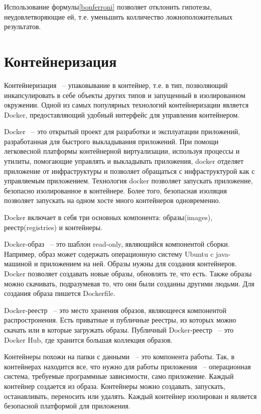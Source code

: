 \documentclass[times,specification,annotation]{itmo-student-thesis}
\begin{document}
Использование формулы\ref{bonferroni} позволяет отклонить гипотезы, неудовлетворяющие ей, т.е. уменьшить колличество ложноположительных результатов.\cite{Bonferroni}

\section{Контейнеризация}

Контейнеризация ~-- упаковывание в контейнер, т.е. в тип, позволяющий инкапсулировать в себе объекты других типов\cite{Containerization} и запущенный в изолированном окружении. Одной из самых популярных технологий контейнеризации является Docker\cite{Docker}, предоставляющий удобный интерфейс для управления контейнером. 

Docker ~-- это открытый проект для разработки и эксплуатации приложений, разработанная для быстрого выкладывания приложений. При помощи легковесной платформы контейнерной виртуализации, используя процессы и утилиты, помогающие управлять и выкладывать приложения\cite{DockerUnderstanding}, docker отделяет приложение от инфраструктуры и позволяет обращаться с инфраструктурой как с управляемым приложением. Технология docker позволяет запускать приложение, безопасно изолированное в контейнере. Более того, безопасная изоляция позволяет запускать на одном хосте много контейнеров одновременно. 

Docker включает в себя три основных компонента: образы(images), реестр(registries) и контейнеры.

Docker-образ ~-- это шаблон read-only, являющийся компонентой сборки. Например, образ может содержать операционную систему Ubuntu c java-машиной и приложением на ней. Образы нужны для создания контейнеров. Docker позволяет создавать новые образы, обновлять те, что есть. Также образы можно скачивать, подразумевая то, что они были созданны другими людьми. Для создания образа пишется Dockerfile.

Docker-реестр ~-- это место хранения образов, являющееся компонентой распростронения. Есть приватные и публичные реестры, из которых можно скачать или в которые загружать образы. Публичный Docker-реестр ~-- это Docker Hub\cite{DockerHub}, где хранится большая коллекция образов.

Контейнеры похожи на папки с данными ~-- это компонента работы. Так, в контейнерах находится все, что нужно для работы приложения ~-- операционная система, требуемые программные зависимости, само приложение. Каждый контейнер создается из образа. Контейнеры можно создавать, запускать, останавливать, переносить или удалять. Каждый контейнер изолирован и является безопасной платформой для приложения.
\end{document}
